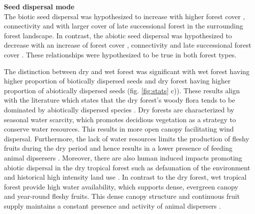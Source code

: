 \textbf{Seed dispersal mode}\\
The biotic seed dispersal was hypothesized to increase with higher forest cover \citep{chazdonDriversBenefitsNatural2025, martinez-ramosNaturalForestRegeneration2016}, connectivity \citep{hordijkLandUseHistory2024, v.h.safarLandscapeOpennessHas2022a} and with larger cover of late successional forest \citep{chazdonDriversBenefitsNatural2025} in the surrounding forest landscape. In contrast, the abiotic seed dispersal was hypothesized to decrease with an increase of forest cover \citep{poorterComprehensiveFrameworkVegetation2024}, connectivity \citep{damschen2014fragmentation} and late successional forest cover \citep{poorterComprehensiveFrameworkVegetation2024}. These relationships were hypothesized to be true in both forest types. 

The distinction between dry and wet forest was significant with wet forest having higher proportion of biotically dispersed seeds and dry forest having higher proportion of abiotically dispersed seeds (fig. \ref{fig:stats} c)). These results 
align with the literature which states that the dry forest's woody flora tends to be dominated by abiotically dispersed species \citep{souzadepaulaRoleSeedRain2023}. Dry forests are characterized by seasonal water scarcity, which promotes decidious vegetation as a strategy to conserve water resources. This results in more open canopy facilitating wind dispersal. Furthermore, the lack of water resources limits the production of fleshy fruits during the dry period and hence results in a lower presence of feeding animal dipsersers \citep{hordijkLandUseHistory2024, lohbeckSuccessionalChangesFunctional2013}. Moreover, there are also human induced impacts promoting abiotic dispersal in the dry tropical forest such as defaunation \citep{souzadepaulaRoleSeedRain2023, chazdonDriversBenefitsNatural2025} of the environment and historical high intensity land use \citep{jakovacRoleLanduseHistory2021, hordijkLandUseHistory2024}. In contrast to the dry forest, wet tropical forest provide high water availability, which supports dense, evergreen canopy and year-round fleshy fruits. This dense canopy structure and continuous fruit supply maintains a constant presence and activity of animal dispersers \citep{poorterComprehensiveFrameworkVegetation2024, i.hordijkLandUseHistory2024}. 


